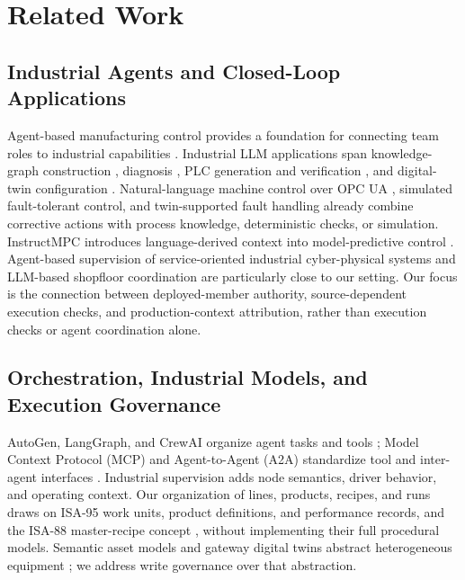 \section{Related Work}
\subsection{Industrial Agents and Closed-Loop Applications}
Agent-based manufacturing control provides a foundation for connecting team
roles to industrial capabilities \cite{leitao2009agentbased}. Industrial
LLM applications span knowledge-graph construction \cite{zhang2026comaikg},
diagnosis \cite{liu2024kgdiag}, PLC generation and verification
\cite{liu2026agents4plc,fakih2024llm4plc}, and digital-twin configuration
\cite{xia2024llmsim}. Natural-language machine control over OPC UA
\cite{hofmann2025nlc}, simulated fault-tolerant control, and twin-supported
fault handling \cite{vyas2026ftc,gill2025llmdt} already combine corrective
actions with process knowledge, deterministic checks, or simulation.
InstructMPC introduces language-derived context into model-predictive control
\cite{wu2025instructmpc}. Agent-based supervision of service-oriented
industrial cyber-physical systems \cite{biskupovic2025supervision} and
LLM-based shopfloor coordination \cite{zhao2026shopfloor} are particularly
close to our setting. Our focus is the connection between deployed-member
authority, source-dependent execution checks, and production-context
attribution, rather than execution checks or agent coordination alone.

\subsection{Orchestration, Industrial Models, and Execution Governance}
AutoGen, LangGraph, and CrewAI organize agent tasks and tools
\cite{wu2023autogen,langgraph2024,crewai2024}; Model Context Protocol
(MCP) and Agent-to-Agent (A2A) standardize tool and inter-agent interfaces \cite{mcp2024,a2a2025}. Industrial supervision adds
node semantics, driver behavior, and operating context. Our
organization of lines, products, recipes, and runs draws on ISA-95 work units,
product definitions, and performance records, and the ISA-88 master-recipe
concept \cite{isa95,isa88}, without implementing their full procedural
models. Semantic asset models and gateway digital twins abstract
heterogeneous equipment \cite{iso23247,iec63278,gautam2025iiot}; we address
write governance over that abstraction.


